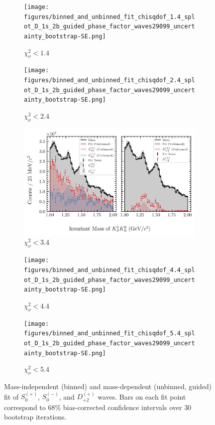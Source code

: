 \begin{figure}[htbp]
    \centering
    \begin{subfigure}{0.45\textwidth}
        \texttt{[image: figures/binned\_and\_unbinned\_fit\_chisqdof\_1.4\_splot\_D\_1s\_2b\_guided\_phase\_factor\_waves29099\_uncertainty\_bootstrap-SE.png]}
        \caption{$\chi^2_\nu < 1.4$}
    \end{subfigure}
    \hfill
    \begin{subfigure}{0.45\textwidth}
        \texttt{[image: figures/binned\_and\_unbinned\_fit\_chisqdof\_2.4\_splot\_D\_1s\_2b\_guided\_phase\_factor\_waves29099\_uncertainty\_bootstrap-SE.png]}
        \caption{$\chi^2_\nu < 2.4$}
    \end{subfigure}

    \vspace{1em}

    \begin{subfigure}{0.8\textwidth}
        \includegraphics[width=\linewidth]{figures/binned_and_unbinned_fit_chisqdof_3.4_splot_D_1s_2b_guided_phase_factor_waves29099_uncertainty_bootstrap-SE.png}
        \caption{$\chi^2_\nu < 3.4$}
    \end{subfigure}

    \vspace{1em}

    \begin{subfigure}{0.45\textwidth}
        \texttt{[image: figures/binned\_and\_unbinned\_fit\_chisqdof\_4.4\_splot\_D\_1s\_2b\_guided\_phase\_factor\_waves29099\_uncertainty\_bootstrap-SE.png]}
        \caption{$\chi^2_\nu < 4.4$}
    \end{subfigure}
    \hfill
    \begin{subfigure}{0.45\textwidth}
        \texttt{[image: figures/binned\_and\_unbinned\_fit\_chisqdof\_5.4\_splot\_D\_1s\_2b\_guided\_phase\_factor\_waves29099\_uncertainty\_bootstrap-SE.png]}
        \caption{$\chi^2_\nu < 5.4$}
    \end{subfigure}

    \caption{Mass-independent (binned) and mass-dependent (unbinned, guided) fit of $S_{0}^{(+)}$, $S_{0}^{(-)}$, and $D_{+2}^{(+)}$ waves. Bars on each fit point correspond to $68\%$ bias-corrected confidence intervals over $ 30 $ bootstrap iterations.}
    \label{fig:unbinned-guided-fit-all-Spn-D2p}
\end{figure}

